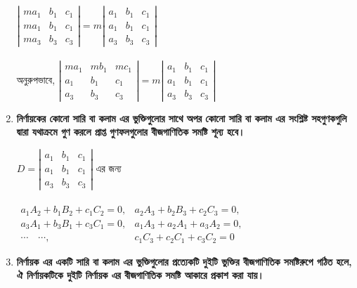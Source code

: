 \begin{enumerate}
	$\left|\begin{array}{ccc}
	ma_1 & b_1 & c_1 \\
	ma_1 & b_1 & c_1 \\
	ma_3 & b_3 & c_3
	\end{array}\right|=m\left|\begin{array}{ccc}
	a_1 & b_1 & c_1 \\
	a_1 & b_1 & c_1 \\
	a_3 & b_3 & c_3
	\end{array}\right|$ \\  \\অনুরুপভাবে, $\left|\begin{array}{ccc}
	ma_1 & mb_1 & mc_1 \\
	a_1 & b_1 & c_1 \\
	a_3 & b_3 & c_3
	\end{array}\right|=m\left|\begin{array}{ccc}
	a_1 & b_1 & c_1 \\
	a_1 & b_1 & c_1 \\
	a_3 & b_3 & c_3
	\end{array}\right|$
	
	\item \textbf{নির্ণায়কের কোনো সারি বা কলাম এর ভুক্তিগুলোর সাথে অপর কোনো সারি বা কলাম এর সংশ্লিষ্ট সহগুণকগুলি দ্বারা যথাক্রমে গুণ করলে প্রাপ্ত গুণফলগুলোর বীজগাণিতিক সমষ্টি শূন্য হবে।}\label{prop-6}

	$D=\left|\begin{array}{ccc}
	a_1 & b_1 & c_1 \\
	a_1 & b_1 & c_1 \\
	a_3 & b_3 & c_3
	\end{array}\right|$ এর জন্য \\ \\
	$\begin{array}{cc}
	a_1A_2+b_1B_2+c_1C_2=0, & a_2A_3+b_2B_3+c_2C_3=0, \\
	a_3A_1+b_3B_1+c_3C_1=0, & a_1A_3+a_2A_1+a_3A_2=0, \\
	\cdots \quad \cdots,		& c_1C_3+c_2C_1+c_3C_2=0
	\end{array}$
	
	\item \textbf{নির্ণায়ক এর একটি সারি বা কলাম এর ভুক্তিগুলোর প্রত্যেকটি দুইটি ভুক্তির বীজগাণিতিক সমষ্টিরুপে গঠিত হলে, ঐ নির্ণায়কটিকে দুইটি নির্ণায়ক এর বীজগাণিতিক সমষ্টি আকারে প্রকাশ করা যায়।}\label{prop-7}


\end{enumerate}
